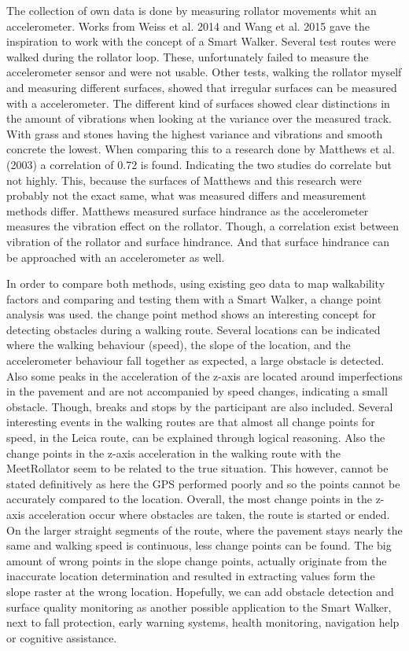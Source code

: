 The collection of own data is done by measuring rollator movements whit an accelerometer. 
Works from Weiss et al. 2014 and Wang et al. 2015 gave the inspiration to work with the concept of a Smart Walker. Several test routes were walked during the rollator loop. These, unfortunately failed to measure the accelerometer sensor and were not usable. Other tests, walking the rollator myself and measuring different surfaces, showed that irregular surfaces can be measured with a accelerometer. The different kind of surfaces showed clear distinctions in the amount of vibrations when looking at the variance over the measured track. With grass and stones having the highest variance and vibrations and smooth concrete the lowest. When comparing this to a research done by Matthews et al. (2003) a correlation of 0.72 is found. Indicating the two studies do correlate but not highly. This, because the surfaces of Matthews and this research were probably not the exact same, what was measured differs and measurement methods differ. Matthews measured surface hindrance as the accelerometer measures the vibration effect on the rollator. Though, a correlation exist between vibration of the rollator and surface hindrance. And that surface hindrance can be approached with an accelerometer as well. 

In order to compare both methods, using existing geo data to map walkability factors and comparing and testing them with a Smart Walker, a change point analysis was used. the change point method shows an interesting concept for detecting obstacles during a walking route. Several locations can be indicated where the walking behaviour (speed), the slope of the location, and the accelerometer behaviour fall together as expected, a large obstacle is detected. Also some peaks in the acceleration of the z-axis are located around imperfections in the pavement and are not accompanied by speed changes, indicating a small obstacle. Though, breaks and stops by the participant are also included. Several interesting events in the walking routes are that almost all change points for speed, in the Leica route, can be explained through logical reasoning. 
Also the change points in the z-axis acceleration in the walking route with the MeetRollator seem to be related to the true situation. This however, cannot be stated definitively as here the GPS performed poorly and so the points cannot be accurately compared to the location. Overall, the most change points in the z-axis acceleration occur where obstacles are taken, the route is started or ended. On the larger straight segments of the route, where the pavement stays nearly the same and walking speed is continuous, less change points can be found. The big amount of wrong points in the slope change points, actually originate from the inaccurate location determination and resulted in extracting values form the slope raster at the wrong location. Hopefully, we can add obstacle detection and surface quality monitoring as another possible application to the Smart Walker, next to fall protection, early warning systems, health monitoring, navigation help or cognitive assistance.


